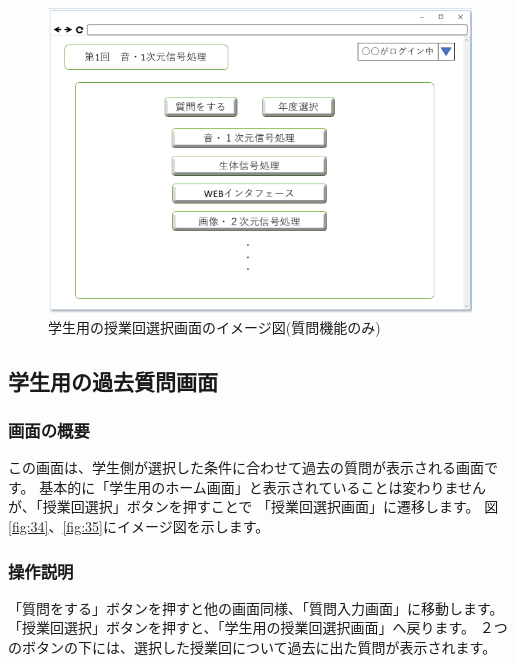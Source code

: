\begin{figure}[phtbp]
  \begin{center}
    \includegraphics[width=1\linewidth,clip]{./img/33.png}
    \caption{学生用の授業回選択画面のイメージ図(質問機能のみ)}\label{fig:33}
  \end{center}
\end{figure}

\newpage

\subsection{学生用の過去質問画面}
\subsubsection{画面の概要}
この画面は、学生側が選択した条件に合わせて過去の質問が表示される画面です。
基本的に「学生用のホーム画面」と表示されていることは変わりませんが、「授業回選択」ボタンを押すことで
「授業回選択画面」に遷移します。
図\ref{fig:34}、\ref{fig:35}にイメージ図を示します。

\subsubsection{操作説明}
「質問をする」ボタンを押すと他の画面同様、「質問入力画面」に移動します。
「授業回選択」ボタンを押すと、「学生用の授業回選択画面」へ戻ります。
２つのボタンの下には、選択した授業回について過去に出た質問が表示されます。

